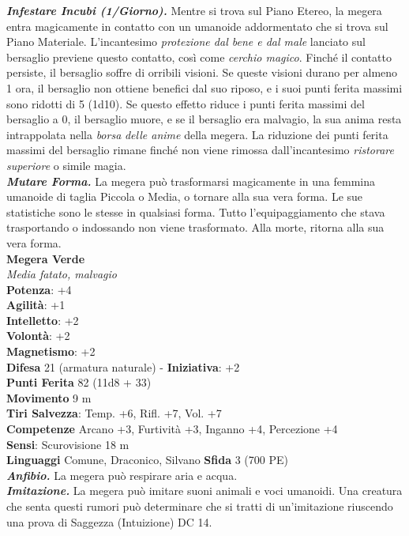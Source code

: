 \begin{multicols}{2}
\emph{\textbf{Infestare Incubi (1/Giorno).}} Mentre si trova sul Piano Etereo, la megera entra magicamente in contatto con un umanoide addormentato che si trova sul Piano Materiale. L'incantesimo \emph{protezione dal bene e dal male} lanciato sul bersaglio previene questo contatto, così come \emph{cerchio magico}. Finché il contatto persiste, il bersaglio soffre di orribili visioni. Se queste visioni durano per almeno 1 ora, il bersaglio non ottiene benefici dal suo riposo, e i suoi punti ferita massimi sono ridotti di 5 (1d10). Se questo effetto riduce i punti ferita massimi del bersaglio a 0, il bersaglio muore, e se il bersaglio era malvagio, la sua anima resta intrappolata nella \emph{borsa} \emph{delle anime} della megera. La riduzione dei punti ferita massimi del bersaglio rimane finché non viene rimossa dall'incantesimo \emph{ristorare} \emph{superiore} o simile magia.\\

\emph{\textbf{Mutare Forma.}} La megera può trasformarsi magicamente in una femmina umanoide di taglia Piccola o Media, o tornare alla sua vera forma. Le sue statistiche sono le stesse in qualsiasi forma. Tutto l'equipaggiamento che stava trasportando o indossando non viene trasformato. Alla morte, ritorna alla sua vera forma.\\

\medskip\textbf{Megera Verde}\\
\emph{Media fatato, malvagio}\\
\textbf{Potenza}: +4\\
\textbf{Agilità}: +1\\
\textbf{Intelletto}: +2\\
\textbf{Volontà}: +2\\
\textbf{Magnetismo}: +2\\
\textbf{Difesa} 21 (armatura naturale) - \textbf{Iniziativa}: +2\\
\textbf{Punti Ferita} 82 (11d8 + 33)\\
\textbf{Movimento} 9 m\\
\textbf{Tiri Salvezza}: Temp. +6, Rifl. +7, Vol. +7\\
\textbf{Competenze} Arcano +3, Furtività +3, Inganno +4, Percezione +4\\
\textbf{Sensi}: Scurovisione 18 m\\
\textbf{Linguaggi} Comune, Draconico, Silvano
\textbf{Sfida} 3 (700 PE)\smallskip\\
\emph{\textbf{Anfibio.}} La megera può respirare aria e acqua.\\
\emph{\textbf{Imitazione.}} La megera può imitare suoni animali e voci umanoidi. Una creatura che senta questi rumori può determinare che si tratti di un'imitazione riuscendo una prova di Saggezza (Intuizione) DC 14.\\


\end{multicols}
